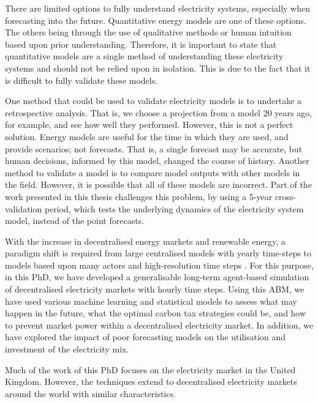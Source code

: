 There are limited options to fully understand electricity systems, especially when forecasting into the future. Quantitative energy models are one of these options. The others being through the use of qualitative methods or human intuition based upon prior understanding. Therefore, it is important to state that quantitative models are a single method of understanding these electricity systems and should not be relied upon in isolation. This is due to the fact that it is difficult to fully validate these models. 

One method that could be used to validate electricity models is to undertake a retrospective analysis. That is, we choose a projection from a model 20 years ago, for example, and see how well they performed. However, this is not a perfect solution. Energy models are useful for the time in which they are used, and provide scenarios; not forecasts. That is, a single forecast may be accurate, but human decisions, informed by this model, changed the course of history. Another method to validate a model is to compare model outputs with other models in the field. However, it is possible that all of these models are incorrect. Part of the work presented in this thesis challenges this problem, by using a 5-year cross-validation period, which tests the underlying dynamics of the electricity system model, instead of the point forecasts.

With the increase in decentralised energy markets and renewable energy, a paradigm shift is required from large centralised models with yearly time-steps to models based upon many actors and high-resolution time steps \cite{Pfenninger2014b, Ringkjob2018}. For this purpose, in this PhD, we have developed a generalisable long-term agent-based simulation of decentralised electricity markets with hourly time steps. Using this \gls{ABM}, we have used various machine learning and statistical models to assess what may happen in the future, what the optimal carbon tax strategies could be, and how to prevent market power within a decentralised electricity market. In addition, we have explored the impact of poor forecasting models on the utilisation and investment of the electricity mix. 

Much of the work of this PhD focuses on the electricity market in the United Kingdom. However, the techniques extend to decentralised electricity markets around the world with similar characteristics. 









